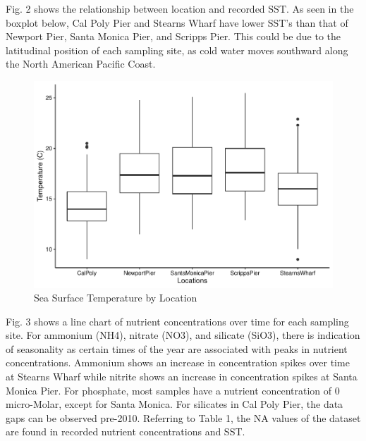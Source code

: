 \documentclass[
  12pt,
]{article}
\begin{document}
\newpage

Fig. 2 shows the relationship between location and recorded SST. As seen
in the boxplot below, Cal Poly Pier and Stearns Wharf have lower SST's
than that of Newport Pier, Santa Monica Pier, and Scripps Pier. This
could be due to the latitudinal position of each sampling site, as cold
water moves southward along the North American Pacific Coast.

\begin{figure}
\centering
\includegraphics{Habs_Final_Report_files/figure-latex/Exploratory Analysis Part 2 SST-1.pdf}
\caption{Sea Surface Temperature by Location}
\end{figure}

\newpage

Fig. 3 shows a line chart of nutrient concentrations over time for each
sampling site. For ammonium (NH4), nitrate (NO3), and silicate (SiO3),
there is indication of seasonality as certain times of the year are
associated with peaks in nutrient concentrations. Ammonium shows an
increase in concentration spikes over time at Stearns Wharf while
nitrite shows an increase in concentration spikes at Santa Monica Pier.
For phosphate, most samples have a nutrient concentration of 0
micro-Molar, except for Santa Monica. For silicates in Cal Poly Pier,
the data gaps can be observed pre-2010. Referring to Table 1, the NA
values of the dataset are found in recorded nutrient concentrations and
SST.
\end{document}
